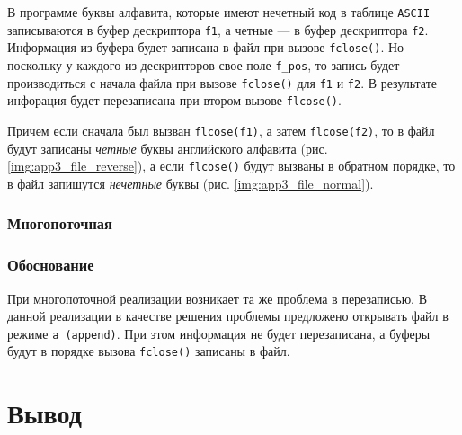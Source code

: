 В программе буквы алфавита, которые имеют нечетный код в таблице \texttt{ASCII} записываются в буфер дескриптора \texttt{f1}, а четные --- в буфер дескриптора \texttt{f2}. Информация из буфера будет записана в файл при вызове \texttt{fclose()}. Но поскольку у каждого из дескрипторов свое поле \texttt{f\_pos}, то запись будет производиться с начала файла при вызове \texttt{fclose()} для \texttt{f1} и \texttt{f2}. В результате инфорация будет перезаписана при втором вызове \texttt{flcose()}.

Причем если сначала был вызван \texttt{flcose(f1)}, а затем \texttt{flcose(f2)}, то в файл будут записаны \textit{четные} буквы английского алфавита (рис. \ref{img:app3_file_reverse}), а если \texttt{flcose()} будут вызваны в обратном порядке, то в файл запишутся \textit{нечетные} буквы (рис. \ref{img:app3_file_normal}).





\subsection{Многопоточная}

\begin{center}
    \captionsetup{justification=raggedright,singlelinecheck=off}
    
\end{center}


\subsection{Обоснование}

При многопоточной реализации возникает та же проблема в перезаписью. В данной реализации в качестве решения проблемы предложено открывать файл в режиме \texttt{a (append)}. При этом информация не будет перезаписана, а буферы будут в порядке вызова \texttt{fclose()} записаны в файл.




\chapter*{Вывод}

